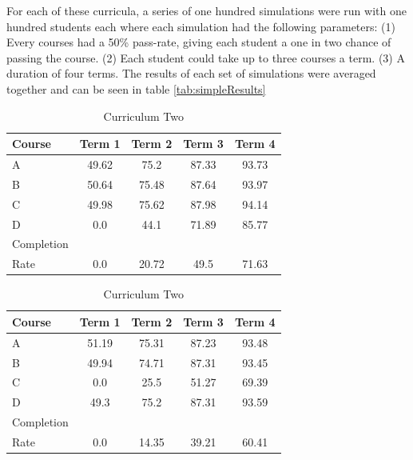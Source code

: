 \documentclass[botnum, fleqn]{unmeethesis}
\begin{document}
    For each of these curricula, a series of one hundred simulations were run with one hundred students each where each simulation had the following parameters: 
    (1) Every courses had a 50\% pass-rate, giving each student a one in two chance of passing the course. (2) Each student could take up to three courses a term. (3) A duration of four terms.
    The results of each set of simulations were averaged together and can be seen in table \ref{tab:simpleResults}

    \begin{table}[!h]
      \tiny
      \caption{}
      \begin{subtable}{0.45\linewidth}
        \centering
          \caption{Curriculum One}
          \label{tab:simple4}
          \begin{tabular}{l*{4}{c}}
            Course  & Term 1 & Term 2 & Term 3 & Term 4 \\
            \hline
            A       & 49.62 & 75.2  & 87.33 & 93.73 \\
            B       & 50.64 & 75.48 & 87.64 & 93.97 \\
            C       & 49.98 & 75.62 & 87.98 & 94.14 \\
            D       & 0.0 & 44.1 & 71.89 & 85.77 \\
            \hline
            Completion \\ Rate & 0.0 & 20.72 & 49.5 & 71.63
          \end{tabular}
      \end{subtable}\hfill
      \begin{subtable}{0.45\linewidth}
        \centering
          \caption{Curriculum Two}
          \label{tab:simple7}
          \begin{tabular}{l*{4}{c}}
            Course  & Term 1 & Term 2 & Term 3 & Term 4 \\
            \hline
            A       & 51.19 & 75.31 & 87.23 & 93.48 \\
            B       & 49.94 & 74.71 & 87.31 & 93.45 \\
            C       & 0.0   & 25.5  & 51.27 & 69.39 \\
            D       & 49.3  & 75.2  & 87.31 & 93.59 \\
            \hline
            Completion \\ Rate & 0.0 & 14.35 & 39.21 & 60.41 \\
          \end{tabular}
      \end{subtable}


\end{table}
\end{document}
